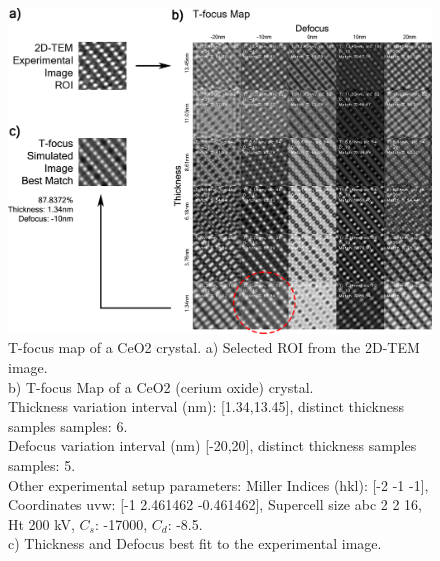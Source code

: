 \documentclass[
  oneside,
  11pt, a4paper,
  footinclude=true,
  headinclude=true,
  cleardoublepage=empty
]{scrbook}
\begin{document}
\begin{figure}[!ht]
	\begin{center}



	\includegraphics[width=1\textwidth]{img/t_focus_map.png}
			\caption[T-focus map of a CeO2 crystal]{T-focus map of a CeO2 crystal.\newline 
						a) Selected ROI from the 2D-TEM image.\\
			b) T-focus Map of a CeO2 (cerium oxide) crystal.\\
			Thickness variation interval (nm): [1.34,13.45], distinct thickness samples samples: 6.\\
			Defocus variation interval (nm) [-20,20], distinct thickness samples samples: 5.\\
			{Other experimental setup parameters: Miller Indices  (hkl): [-2 -1 -1], Coordinates uvw: [-1 2.461462 -0.461462], Supercell size abc 2 2 16, Ht 200 kV, {$C_s$}: -17000, {$C_d$}: -8.5.}\\
			{c) Thickness and Defocus best fit to the experimental image.}
			}
	\label{fig:t_focus_map}
		\end{center}
	\end{figure}
\end{document}
